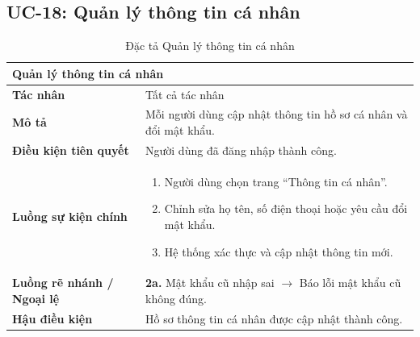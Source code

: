 \subsection{UC-18: Quản lý thông tin cá nhân}
\begin{table}[H]
  \centering
  \begin{tabularx}{\textwidth}{|l|X|}
    \hline
    \multicolumn{2}{|l|}{\textbf{Quản lý thông tin cá nhân}} \\
    \hline
    \textbf{Tác nhân}           & Tất cả tác nhân \\ \hline
    \textbf{Mô tả}              & Mỗi người dùng cập nhật thông tin hồ sơ cá nhân và đổi mật khẩu. \\ \hline
    \textbf{Điều kiện tiên quyết} & Người dùng đã đăng nhập thành công. \\ \hline
    \textbf{Luồng sự kiện chính} &
      \begin{enumerate}[leftmargin=*, nosep, topsep=0pt]
        \item Người dùng chọn trang ``Thông tin cá nhân''.
        \item Chỉnh sửa họ tên, số điện thoại hoặc yêu cầu đổi mật khẩu.
        \item Hệ thống xác thực và cập nhật thông tin mới.
      \end{enumerate} \\ \hline
    \textbf{Luồng rẽ nhánh / Ngoại lệ} &
      \textbf{2a.} Mật khẩu cũ nhập sai $\rightarrow$ Báo lỗi mật khẩu cũ không đúng. \\ \hline
    \textbf{Hậu điều kiện}      & Hồ sơ thông tin cá nhân được cập nhật thành công. \\
    \hline
  \end{tabularx}
  \caption{Đặc tả Quản lý thông tin cá nhân}
  \label{tab:uc18}
\end{table}

